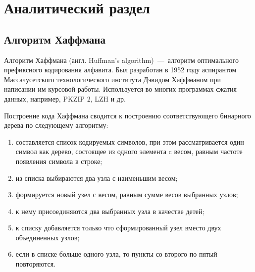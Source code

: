 \chapter{Аналитический раздел}

\section{Алгоритм Хаффмана}

Алгоритм Хаффмана (англ. Huffman's algorithm)~---~алгоритм оптимального префиксного кодирования алфавита.
Был разработан в 1952 году аспирантом Массачусетского технологического института Дэвидом Хаффманом при написании им курсовой работы.
Используется во многих программах сжатия данных, например, PKZIP 2, LZH и др.

Построение кода Хаффмана сводится к построению соответствующего бинарного дерева по следующему алгоритму:
\begin{enumerate}
	\item составляется список кодируемых символов, при этом рассматривается один символ как дерево, состоящее из одного элемента c весом, равным частоте появления символа в строке;
	\item из списка выбираются два узла с наименьшим весом;
	\item формируется новый узел с весом, равным сумме весов выбранных узлов;
	\item к нему присоединяются два выбранных узла в качестве детей;
	\item к списку добавляется только что сформированный узел вместо двух объединенных узлов;
	\item если в списке больше одного узла, то пункты со второго по пятый повторяются.
\end{enumerate}